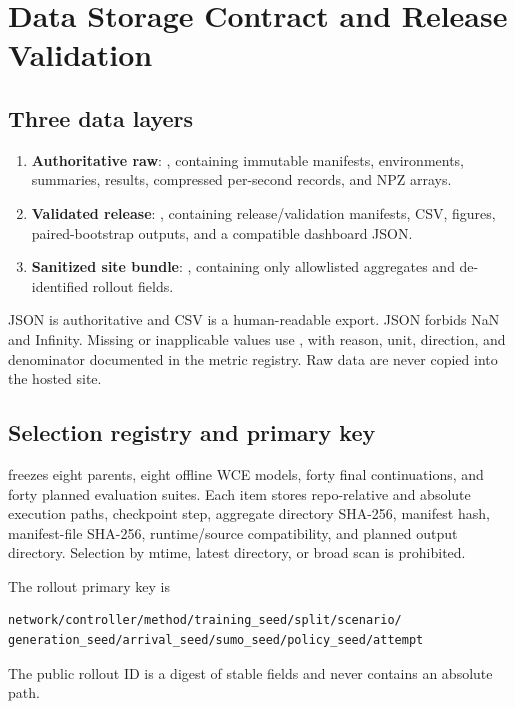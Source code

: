 \chapter{Data Storage Contract and Release Validation}

\section{Three data layers}
\begin{enumerate}
  \item \textbf{Authoritative raw}: , containing immutable manifests, environments, summaries, results, compressed per-second records, and NPZ arrays.
  \item \textbf{Validated release}: , containing release/validation manifests, CSV, figures, paired-bootstrap outputs, and a compatible dashboard JSON.
  \item \textbf{Sanitized site bundle}: , containing only allowlisted aggregates and de-identified rollout fields.
\end{enumerate}

JSON is authoritative and CSV is a human-readable export. JSON forbids NaN and Infinity. Missing or inapplicable values use , with reason, unit, direction, and denominator documented in the metric registry. Raw data are never copied into the hosted site.

\section{Selection registry and primary key}
 freezes eight parents, eight offline WCE models, forty final continuations, and forty planned evaluation suites. Each item stores repo-relative and absolute execution paths, checkpoint step, aggregate directory SHA-256, manifest hash, manifest-file SHA-256, runtime/source compatibility, and planned output directory. Selection by mtime, latest directory, or broad scan is prohibited.

The rollout primary key is
\begin{Verbatim}[fontsize=\small,breaklines=true]
network/controller/method/training_seed/split/scenario/
generation_seed/arrival_seed/sumo_seed/policy_seed/attempt
\end{Verbatim}
The public rollout ID is a digest of stable fields and never contains an absolute path.

